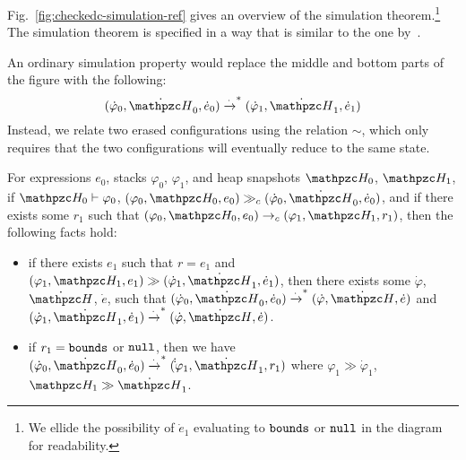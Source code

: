 Fig.~\ref{fig:checkedc-simulation-ref} gives an overview of 
the simulation theorem.\footnote{We ellide the  possibility of $\dot e_1$ evaluating to $\mathtt{bounds}$ or $\mathtt{null}$ in the diagram for readability.} The simulation theorem is specified in a way
that is similar to the one by~\citet{merigoux2021catala}.

An ordinary simulation property would
replace the middle and bottom parts of the figure with the
following: \[(\dot \varphi_0, \dot \heap_0, \dot e_0) 
  \xrightarrow{\cdot}^* (\dot \varphi_1, \dot \heap_1, \dot e_1)\]
Instead, we relate two erased configurations using the relation $\sim$,
which only requires that the two configurations will eventually reduce
to the same state.


\begin{thm}\label{simulation-thm}
For \lang expressions $e_0$, stacks $\varphi_0$, $\varphi_1$, and heap snapshots $\heap_0$, $\heap_1$, 
if $\heap_0 \vdash \varphi_0$, $(\varphi_0,\heap_0,e_0)\gg_c (\dot \varphi_0,\dot \heap_0, \dot e_0)$,
and if there exists some $r_1$ such that $(\varphi_0, \heap_0, e_0)
\rightarrow_c (\varphi_1, \heap_1, r_1)$, then the following facts hold:

\begin{itemize}

\item if there exists $e_1$ such that $r=e_1$ and $(\varphi_1, \heap_1, e_1) \gg (\dot \varphi_1, \dot \heap_1, \dot e_1)$, then there exists some $\dot \varphi$,$\dot \heap$, $\dot e$, such that
$(\dot \varphi_0, \dot \heap_0,\dot e_0) \xrightarrow{\cdot}^* (\dot
\varphi,\dot \heap,\dot e)$ and $(\dot
\varphi_1,\dot \heap_1,\dot e_1) \xrightarrow{\cdot}^* (\dot \varphi,
\dot \heap,\dot e)$.

\item if $r_1 = \mathtt{bounds}$ or $\mathtt{null}$, then we have $(\dot \varphi_0, \dot \heap_0,\dot e_0) \xrightarrow{\cdot}^* (\dot
\dot \varphi_1,\dot \heap_1, r_1)$ where $\varphi_1 \gg \dot
\varphi_1$, $\heap_1 \gg \dot \heap_1$.

\end{itemize}
\end{thm}



